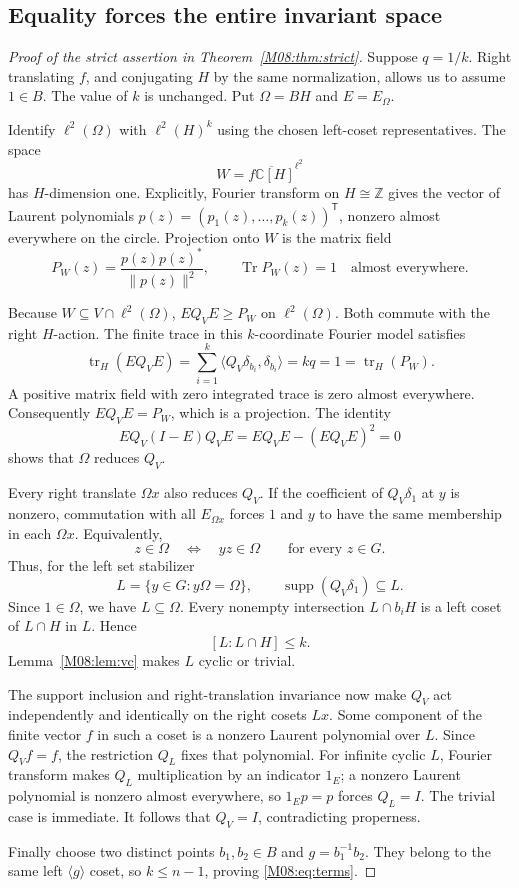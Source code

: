\documentclass[11pt,a4paper,oneside]{report}
\theoremstyle{definition}
\theoremstyle{remark}
\DeclareMathOperator{\supp}{supp}
\DeclareMathOperator{\Tr}{Tr}
\newcommand{\C}{\mathbb C}
\newcommand{\Z}{\mathbb Z}
\begin{document}
\subsection{Equality forces the entire invariant space}

\begin{proof}[Proof of the strict assertion in Theorem~\ref{M08:thm:strict}]
Suppose $q=1/k$. Right translating $f$, and conjugating $H$
by the same normalization, allows us to assume $1\in B$.
The value of $k$ is unchanged. Put $\Omega=BH$ and $E=E_\Omega$.

Identify $\ell^2(\Omega)$ with $\ell^2(H)^k$ using the chosen
left-coset representatives. The space
\[
W=\overline{f\C[H]}^{\ell^2}
\]
has $H$-dimension one. Explicitly, Fourier transform on
$H\cong\Z$ gives the vector of Laurent polynomials
$p(z)=(p_1(z),\ldots,p_k(z))^{\mathsf T}$, nonzero almost
everywhere on the circle. Projection onto $W$ is the matrix field
\[
P_W(z)=\frac{p(z)p(z)^*}{\|p(z)\|^2},
\qquad\Tr P_W(z)=1\quad\text{almost everywhere}.
\]

Because $W\subseteq V\cap\ell^2(\Omega)$,
$EQ_VE\ge P_W$ on $\ell^2(\Omega)$. Both commute with the
right $H$-action. The finite trace in this $k$-coordinate
Fourier model satisfies
\[
\operatorname{tr}_H(EQ_VE)
=\sum_{i=1}^k\langle Q_V\delta_{b_i},\delta_{b_i}\rangle
=kq=1=\operatorname{tr}_H(P_W).
\]
A positive matrix field with zero integrated trace is zero almost
everywhere. Consequently $EQ_VE=P_W$, which is a projection.
The identity
\[
EQ_V(I-E)Q_VE=EQ_VE-(EQ_VE)^2=0
\]
shows that $\Omega$ reduces $Q_V$.

Every right translate $\Omega x$ also reduces $Q_V$.
If the coefficient of $Q_V\delta_1$ at $y$ is nonzero,
commutation with all $E_{\Omega x}$ forces $1$ and $y$ to
have the same membership in each $\Omega x$. Equivalently,
\[
z\in\Omega\quad\Longleftrightarrow\quad yz\in\Omega
\qquad\text{for every }z\in G.
\]
Thus, for the left set stabilizer
\[
L=\{y\in G:y\Omega=\Omega\},
\qquad \supp(Q_V\delta_1)\subseteq L.
\]
Since $1\in\Omega$, we have $L\subseteq\Omega$.
Every nonempty intersection $L\cap b_iH$ is a left coset
of $L\cap H$ in $L$. Hence
\[
[L:L\cap H]\le k.
\]
Lemma~\ref{M08:lem:vc} makes $L$ cyclic or trivial.

The support inclusion and right-translation invariance now make
$Q_V$ act independently and identically on the right cosets $Lx$.
Some component of the finite vector $f$ in such a coset is a
nonzero Laurent polynomial over $L$. Since $Q_Vf=f$, the
restriction $Q_L$ fixes that polynomial. For infinite cyclic $L$,
Fourier transform makes $Q_L$ multiplication by an indicator
$1_E$; a nonzero Laurent polynomial is nonzero almost everywhere,
so $1_Ep=p$ forces $Q_L=I$. The trivial case is immediate.
It follows that $Q_V=I$, contradicting properness.

Finally choose two distinct points $b_1,b_2\in B$ and
$g=b_1^{-1}b_2$. They belong to the same left $\langle g\rangle$
coset, so $k\le n-1$, proving \eqref{M08:eq:terms}.
\end{proof}
\end{document}
